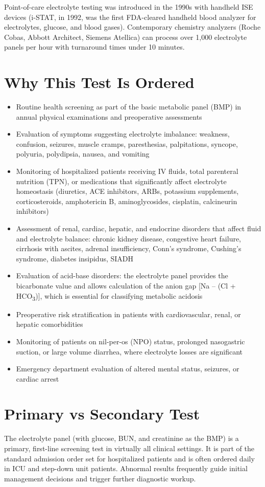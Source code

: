 Point-of-care electrolyte testing was introduced in the 1990s with handheld ISE devices (i-STAT, in 1992, was the first FDA-cleared handheld blood analyzer for electrolytes, glucose, and blood gases). Contemporary chemistry analyzers (Roche Cobas, Abbott Architect, Siemens Atellica) can process over 1,000 electrolyte panels per hour with turnaround times under 10 minutes.

\section*{Why This Test Is Ordered}
\begin{itemize}
  \item Routine health screening as part of the basic metabolic panel (BMP) in annual physical examinations and preoperative assessments
  \item Evaluation of symptoms suggesting electrolyte imbalance: weakness, confusion, seizures, muscle cramps, paresthesias, palpitations, syncope, polyuria, polydipsia, nausea, and vomiting
  \item Monitoring of hospitalized patients receiving IV fluids, total parenteral nutrition (TPN), or medications that significantly affect electrolyte homeostasis (diuretics, ACE inhibitors, ARBs, potassium supplements, corticosteroids, amphotericin B, aminoglycosides, cisplatin, calcineurin inhibitors)
  \item Assessment of renal, cardiac, hepatic, and endocrine disorders that affect fluid and electrolyte balance: chronic kidney disease, congestive heart failure, cirrhosis with ascites, adrenal insufficiency, Conn's syndrome, Cushing's syndrome, diabetes insipidus, SIADH
  \item Evaluation of acid-base disorders: the electrolyte panel provides the bicarbonate value and allows calculation of the anion gap [Na -- (Cl + HCO\textsubscript{3})], which is essential for classifying metabolic acidosis
  \item Preoperative risk stratification in patients with cardiovascular, renal, or hepatic comorbidities
  \item Monitoring of patients on nil-per-os (NPO) status, prolonged nasogastric suction, or large volume diarrhea, where electrolyte losses are significant
  \item Emergency department evaluation of altered mental status, seizures, or cardiac arrest
\end{itemize}

\section*{Primary vs Secondary Test}
The electrolyte panel (with glucose, BUN, and creatinine as the BMP) is a primary, first-line screening test in virtually all clinical settings. It is part of the standard admission order set for hospitalized patients and is often ordered daily in ICU and step-down unit patients. Abnormal results frequently guide initial management decisions and trigger further diagnostic workup.


